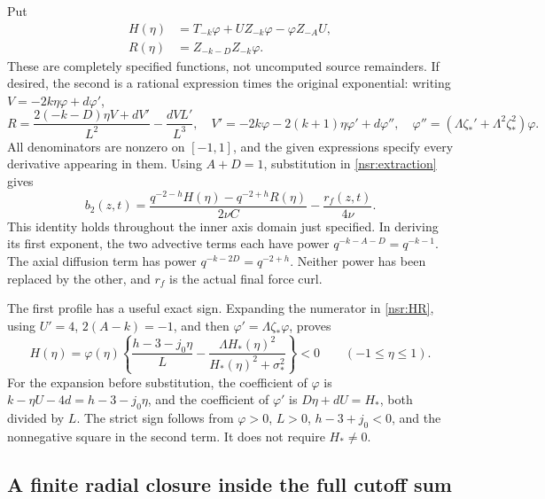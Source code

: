 Put
\begin{equation}\label{nsr:HR}
 \begin{split}
 H(\eta)&=T_{-k}\varphi+U Z_{-k}\varphi-\varphi Z_{-A}U,\\
 R(\eta)&=Z_{-k-D}Z_{-k}\varphi.
 \end{split}
\end{equation}
These are completely specified functions, not uncomputed source
remainders. If desired, the second is a rational expression times
the original exponential: writing \(V=-2k\eta\varphi+d\varphi'\),
\[
 R=\frac{2(-k-D)\eta V+d V'}{L^2}-\frac{d V L'}{L^3},
 \quad V'=-2k\varphi-2(k+1)\eta\varphi'+d\varphi'',
 \quad \varphi''=(\Lambda\zeta_*'+\Lambda^2\zeta_*^2)\varphi.
\]
All denominators are nonzero on \([-1,1]\), and the given expressions
specify every derivative appearing in them.
Using \(A+D=1\), substitution in \eqref{nsr:extraction} gives
\begin{equation}\label{nsr:full-b2}
 \boxed{\quad
 b_2(z,t)=\frac{q^{-2-h}H(\eta)-q^{-2+h}R(\eta)}{2\nu C}
                         -\frac{r_f(z,t)}{4\nu}.
 \quad}
\end{equation}
This identity holds throughout the inner axis domain just specified.
In deriving its first exponent, the two advective terms each have
power \(q^{-k-A-D}=q^{-k-1}\). The axial diffusion term has
power \(q^{-k-2D}=q^{-2+h}\). Neither power has been replaced
by the other, and \(r_f\) is the actual final force curl.

The first profile has a useful exact sign. Expanding the numerator
in \eqref{nsr:HR}, using \(U'=4\), \(2(A-k)=-1\), and then
\(\varphi'=\Lambda\zeta_*\varphi\), proves
\begin{equation}\label{nsr:H-sign}
 H(\eta)=\varphi(\eta)
 \left\{\frac{h-3-j_0\eta}{L}
                  -\frac{\Lambda H_*(\eta)^2}{H_*(\eta)^2+\sigma_*^2}\right\}<0
                    \qquad(-1\leq\eta\leq1).
\end{equation}
For the expansion before substitution, the coefficient of \(\varphi\)
is \(k-\eta U-4d=h-3-j_0\eta\), and the coefficient of
\(\varphi'\) is \(D\eta+dU=H_*\), both divided by \(L\).
The strict sign follows from \(\varphi>0\), \(L>0\),
\(h-3+j_0<0\), and the nonnegative square in the second term.
It does not require \(H_*\ne0\).

\subsection{A finite radial closure inside the full cutoff sum}


